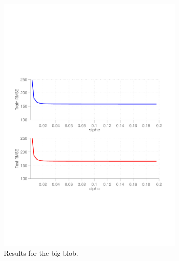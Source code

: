\begin{figure}[ht]
  \centering
  \begin{subfigure}[b]{0.45\textwidth}
   \includegraphics[width=\textwidth]{figures/alpha_curve1.pdf}
    \caption{Results for the big blob.}
    \label{fig:alpha1}
  \end{subfigure}
  \hfill
  \begin{subfigure}[b]{0.45\textwidth}

\end{subfigure}
\end{figure}
